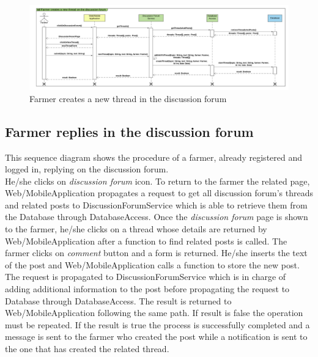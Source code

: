 \newpage
\begin{landscape}
\begin{figure}[h]
\vspace*{-2cm}
\noindent
\centering
\centerline{\includegraphics[scale= 0.108]{./Images/Sequence diagram/Farmer creates a new thread on the discussion forum.png}}
    \caption{Farmer creates a new thread in the discussion forum}
    \vspace*{-12cm}
\end{figure}
\fillandplacepagenumber
\end{landscape}

\subsection{Farmer replies in the discussion forum}

This sequence diagram shows the procedure of a farmer, already registered and logged in, replying on the discussion forum.\\
He/she clicks on \textit{discussion forum} icon. To return to the farmer the related page, Web/MobileApplication propagates a request to get all discussion forum's threads and related posts to DiscussionForumService which is able to retrieve them from the Database through DatabaseAccess. 
Once the \textit{discussion forum} page is shown to the farmer, he/she clicks on a thread whose details are returned by Web/MobileApplication after a function to find related posts is called. The farmer clicks on \textit{comment} button and a form is returned. He/she inserts the text of the post and Web/MobileApplication calls a function to store the new post. The request is propagated to DiscussionForumService which is in charge of  adding additional information to the post before propagating the request to Database through DatabaseAccess. The result is returned to Web/MobileApplication following the same path. If result is false the operation must be repeated. If the result is true the process is successfully completed and a message is sent to the farmer who created the post while a notification is sent to the one that has created the related thread. 

